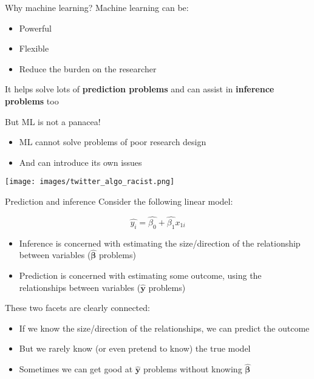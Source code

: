 \documentclass[
  ignorenonframetext,
]{beamer}
\providecommand{\tightlist}{%
  \setlength{\itemsep}{0pt}\setlength{\parskip}{0pt}}
\begin{document}
\begin{frame}{Why machine learning?}
\protect\hypertarget{why-machine-learning}{}
Machine learning can be:

\begin{itemize}
\tightlist
\item
  Powerful
\item
  Flexible
\item
  Reduce the burden on the researcher
\end{itemize}

It helps solve lots of \textbf{prediction problems} and can assist in
\textbf{inference problems} too

But ML is not a panacea!

\begin{itemize}
\item
  ML cannot solve problems of poor research design
\item
  And can introduce its own issues
\end{itemize}

\texttt{[image: images/twitter\_algo\_racist.png]}
\end{frame}

\begin{frame}{Prediction and inference}
\protect\hypertarget{prediction-and-inference}{}
Consider the following linear model:

\[
\hat{y_i} = \hat{\beta_0} + \hat{\beta_1}x_{1i}
\]

\begin{itemize}
\tightlist
\item
  Inference is concerned with estimating the size/direction of the
  relationship between variables (\(\bm{\hat{\beta}}\) problems)
\item
  Prediction is concerned with estimating some outcome, using the
  relationships between variables (\(\bm{\hat{y}}\) problems)
\end{itemize}

These two facets are clearly connected:

\begin{itemize}
\tightlist
\item
  If we know the size/direction of the relationships, we can predict the
  outcome
\item
  But we rarely know (or even pretend to know) the true model
\item
  Sometimes we can get good at \(\hat{\bm{y}}\) problems without knowing
  \(\hat{\bm{\beta}}\)
\end{itemize}
\end{frame}
\end{document}
